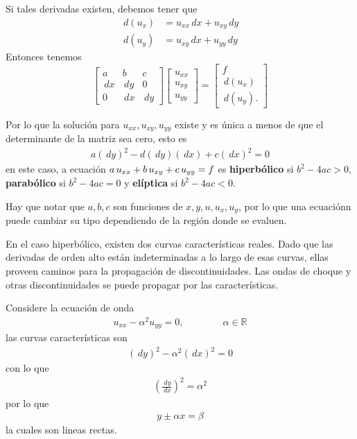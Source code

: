 Si tales derivadas existen, debemos tener que
\begin{align*}
\,d(u_x) &= u_{xx} \,dx + u_{xy} \,dy \\
\,d(u_y) &= u_{xy} \,dx + u_{yy} \,dy
\end{align*}
Entonces tenemos
\[
\begin{bmatrix}
a	  &	  b	  &	c	\\
\,dx  &  \,dy  &	 0	\\
0	  &	\,dx	   & \,dy
\end{bmatrix}
\begin{bmatrix}
u_{xx}	\\	u_{xy}	\\	u_{yy}	
\end{bmatrix}
=
\begin{bmatrix}
f	\\	\,d(u_x)	\\	\,d(u_y).
\end{bmatrix}
\]

Por lo que la solución para $u_{xx}, u_{xy}, u_{yy}$ existe y es única a menos de que el determinante de la matriz sea cero, esto es
\begin{align*}
a (\,dy)^2 - d (\,dy)(\,dx) + c (\,dx)^2 = 0
\end{align*}
en este caso, a ecuación $a \thinspace u_{xx} + b \thinspace u_{xy} + c \thinspace u_{yy} = f$ es \textbf{hiperbólico} si $b^2 - 4ac > 0$, \textbf{parabólico} si $b^2 - 4ac = 0$ y \textbf{elíptica} si $b^2 - 4ac < 0$.

Hay que notar que $a, b, c$ son funciones de $x,y,u,u_x, u_y$, por lo que una ecuaciónn puede cambiar su tipo dependiendo de la región donde se evaluen.

En el caso hiperbólico, existen dos curvas características reales. Dado que las derivadas de orden alto están indeterminadas a lo largo de esas curvas, ellas proveen caminos para la propagación de discontinuidades. Las ondas de choque y otras discontinuidades se puede propagar por las características.

Considere la ecuación de onda
\begin{align*}
u_{xx} - \alpha^2 u_{yy} = 0, \qquad \qquad \alpha \in \mathbb{R}
\end{align*}
las curvas características son
\begin{align*}
(\,dy)^2 - \alpha^2 (\,dx)^2 = 0
\end{align*}
con lo que
\begin{align*}
\left( \frac{\,dy}{\,dx}  \right)^2 = \alpha^2
\end{align*}
por lo que
\begin{align*}
y \pm \alpha x = \beta
\end{align*}
la cuales son lineas rectas.

